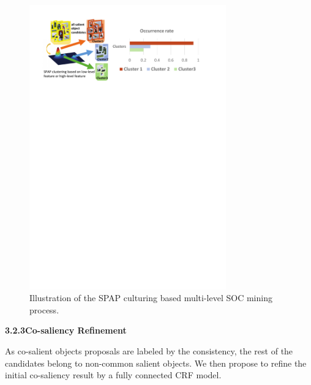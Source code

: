 \documentclass[sigconf]{acmart}
\begin{document}
  \begin{figure}[tp]
\centering
\includegraphics[scale=0.65,width=8.5cm]{Fig4.pdf}
\caption{Illustration of the SPAP culturing based multi-level SOC mining process. }
\label{fig:label}
\end{figure}
 
\vspace{3pt}
\noindent \textbf{3.2.3\quad Co-saliency Refinement}
\vspace{3pt}

\noindent As co-salient objects proposals are labeled by the consistency, the rest of the candidates belong to non-common salient objects. We then propose to refine the initial co-saliency result by a fully connected CRF model.
\end{document}
